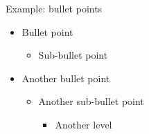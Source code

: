 \begin{frame}{Example: bullet points}
    \begin{itemize}
        \item Bullet point
        \begin{itemize}
            \item Sub-bullet point
        \end{itemize}
        \item Another bullet point
        \begin{itemize}
            \item Another sub-bullet point
            \begin{itemize}
                \item Another level
            \end{itemize}
        \end{itemize}
    \end{itemize}
\end{frame}